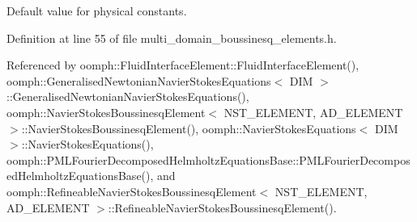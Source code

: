 Default value for physical constants. 



Definition at line 55 of file multi\+\_\+domain\+\_\+boussinesq\+\_\+elements.\+h.



Referenced by oomph\+::\+Fluid\+Interface\+Element\+::\+Fluid\+Interface\+Element(), oomph\+::\+Generalised\+Newtonian\+Navier\+Stokes\+Equations$<$ D\+I\+M $>$\+::\+Generalised\+Newtonian\+Navier\+Stokes\+Equations(), oomph\+::\+Navier\+Stokes\+Boussinesq\+Element$<$ N\+S\+T\+\_\+\+E\+L\+E\+M\+E\+N\+T, A\+D\+\_\+\+E\+L\+E\+M\+E\+N\+T $>$\+::\+Navier\+Stokes\+Boussinesq\+Element(), oomph\+::\+Navier\+Stokes\+Equations$<$ D\+I\+M $>$\+::\+Navier\+Stokes\+Equations(), oomph\+::\+P\+M\+L\+Fourier\+Decomposed\+Helmholtz\+Equations\+Base\+::\+P\+M\+L\+Fourier\+Decomposed\+Helmholtz\+Equations\+Base(), and oomph\+::\+Refineable\+Navier\+Stokes\+Boussinesq\+Element$<$ N\+S\+T\+\_\+\+E\+L\+E\+M\+E\+N\+T, A\+D\+\_\+\+E\+L\+E\+M\+E\+N\+T $>$\+::\+Refineable\+Navier\+Stokes\+Boussinesq\+Element().

